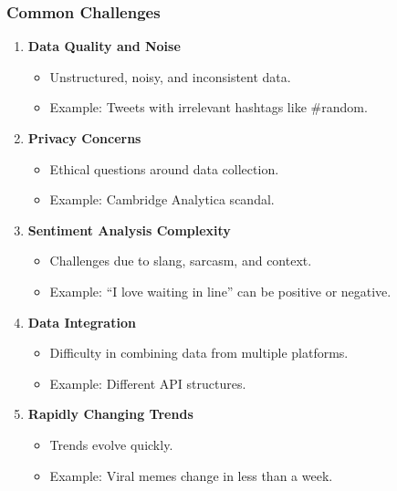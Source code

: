 \documentclass{beamer}
\begin{document}
\begin{frame}[fragile]
    \frametitle{Common Challenges}
    \begin{enumerate}
        \item \textbf{Data Quality and Noise}
            \begin{itemize}
                \item Unstructured, noisy, and inconsistent data.
                \item Example: Tweets with irrelevant hashtags like \#random.
            \end{itemize}
        \item \textbf{Privacy Concerns}
            \begin{itemize}
                \item Ethical questions around data collection.
                \item Example: Cambridge Analytica scandal.
            \end{itemize}
        \item \textbf{Sentiment Analysis Complexity}
            \begin{itemize}
                \item Challenges due to slang, sarcasm, and context.
                \item Example: “I love waiting in line” can be positive or negative.
            \end{itemize}
        \item \textbf{Data Integration}
            \begin{itemize}
                \item Difficulty in combining data from multiple platforms.
                \item Example: Different API structures.
            \end{itemize}
        \item \textbf{Rapidly Changing Trends}
            \begin{itemize}
                \item Trends evolve quickly.
                \item Example: Viral memes change in less than a week.
            \end{itemize}
    \end{enumerate}
\end{frame}
\end{document}
